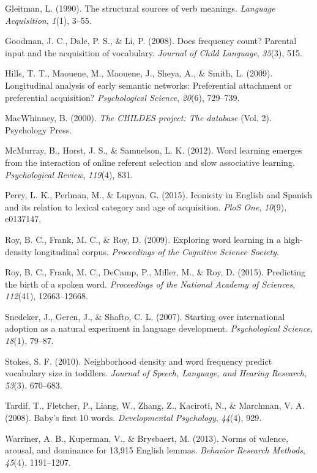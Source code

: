 \documentclass[10pt, letterpaper]{article}
\begin{document}
Gleitman, L. (1990). The structural sources of verb meanings.
\emph{Language Acquisition}, \emph{1}(1), 3--55.

Goodman, J. C., Dale, P. S., \& Li, P. (2008). Does frequency count?
Parental input and the acquisition of vocabulary. \emph{Journal of Child
Language}, \emph{35}(3), 515.

Hills, T. T., Maouene, M., Maouene, J., Sheya, A., \& Smith, L. (2009).
Longitudinal analysis of early semantic networks: Preferential
attachment or preferential acquisition? \emph{Psychological Science},
\emph{20}(6), 729--739.

MacWhinney, B. (2000). \emph{The CHILDES project: The database} (Vol.
2). Psychology Press.

McMurray, B., Horst, J. S., \& Samuelson, L. K. (2012). Word learning
emerges from the interaction of online referent selection and slow
associative learning. \emph{Psychological Review}, \emph{119}(4), 831.

Perry, L. K., Perlman, M., \& Lupyan, G. (2015). Iconicity in English
and Spanish and its relation to lexical category and age of acquisition.
\emph{PloS One}, \emph{10}(9), e0137147.

Roy, B. C., Frank, M. C., \& Roy, D. (2009). Exploring word learning in
a high-density longitudinal corpus. \emph{Proceedings of the Cognitive
Science Society}.

Roy, B. C., Frank, M. C., DeCamp, P., Miller, M., \& Roy, D. (2015).
Predicting the birth of a spoken word. \emph{Proceedings of the National
Academy of Sciences}, \emph{112}(41), 12663--12668.

Snedeker, J., Geren, J., \& Shafto, C. L. (2007). Starting over
international adoption as a natural experiment in language development.
\emph{Psychological Science}, \emph{18}(1), 79--87.

Stokes, S. F. (2010). Neighborhood density and word frequency predict
vocabulary size in toddlers. \emph{Journal of Speech, Language, and
Hearing Research}, \emph{53}(3), 670--683.

Tardif, T., Fletcher, P., Liang, W., Zhang, Z., Kaciroti, N., \&
Marchman, V. A. (2008). Baby's first 10 words. \emph{Developmental
Psychology}, \emph{44}(4), 929.

Warriner, A. B., Kuperman, V., \& Brysbaert, M. (2013). Norms of
valence, arousal, and dominance for 13,915 English lemmas.
\emph{Behavior Research Methods}, \emph{45}(4), 1191--1207.
\end{document}
